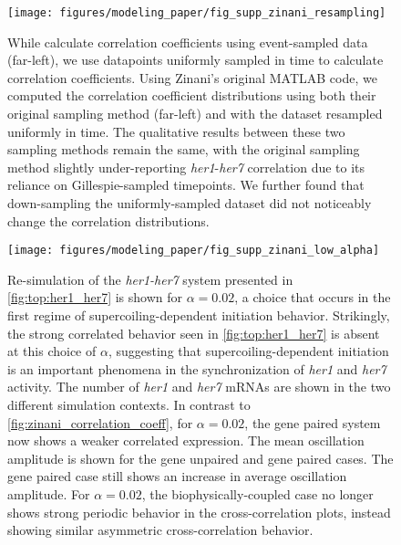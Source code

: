 \documentclass[11pt]{article}
\begin{document}
\begin{figure}[hbtp]
    \centering
    {\texttt{[image: figures/modeling\_paper/fig\_supp\_zinani\_resampling]}
    }
    \caption{While \textcite{zinaniPairingSegmentationClock2021} calculate correlation coefficients using event-sampled data (far-left), we use datapoints uniformly sampled in time to calculate correlation coefficients. Using Zinani's original MATLAB code, we computed the correlation coefficient distributions using both their original sampling method (far-left) and with the dataset resampled uniformly in time. The qualitative results between these two sampling methods remain the same, with the original sampling method slightly under-reporting \textit{her1}-\textit{her7} correlation due to its reliance on Gillespie-sampled timepoints. We further found that down-sampling the uniformly-sampled dataset did not noticeably change the correlation distributions.
    }
    \label{fig:top:supp_zinani_sampling}
\end{figure}

\begin{figure}[hbtp]
    \centering
    {\texttt{[image: figures/modeling\_paper/fig\_supp\_zinani\_low\_alpha]}
    \label{fig:supp:zinani_alpha_mRNA}
    \label{fig:supp:zinani_alpha_correlation}
    \label{fig:supp:zinani_alpha_oscillation_amplitude}
    \label{fig:supp:zinani_alpha_cross_correlation}
    }
    \caption{Re-simulation of the \textit{her1-her7} system presented in \cref{fig:top:her1_her7} is shown for \(\alpha = 0.02\), a choice that occurs in the first regime of supercoiling-dependent initiation behavior. Strikingly, the strong correlated behavior seen in \cref{fig:top:her1_her7} is absent at this choice of \(\alpha\), suggesting that supercoiling-dependent initiation is an important phenomena in the synchronization of \textit{her1} and \textit{her7} activity.
     The number of \textit{her1} and \textit{her7} mRNAs are shown in the two different simulation contexts.
     In contrast to \cref{fig:zinani_correlation_coeff}, for \(\alpha = 0.02\), the gene paired system now shows a weaker correlated expression.
     The mean oscillation amplitude is shown for the gene unpaired and gene paired cases. The gene paired case still shows an increase in average oscillation amplitude.
     For \(\alpha = 0.02\), the biophysically-coupled case no longer shows strong periodic behavior in the cross-correlation plots, instead showing similar asymmetric cross-correlation behavior.
    }
    \label{fig:top:supp_zinani_alpha}
\end{figure}
\end{document}
